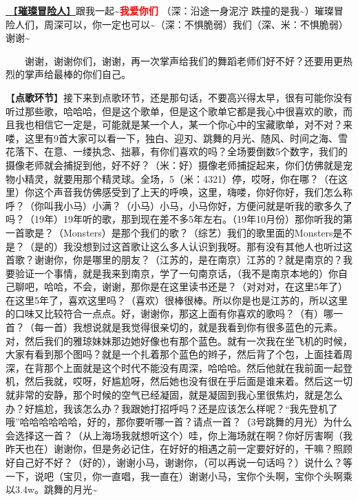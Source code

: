 \documentclass[]{ctexbook}
\begin{document}
\hyperref[adventurers]{🎵【\textbf{璀璨冒险人}】}跟我一起\textasciitilde{}\textbf{\textcolor{red}{我爱你们} }（深：沿途一身泥泞 跌撞的是我\textasciitilde）璀璨冒险人们，周深可以，你一定也可以\textasciitilde（深：不惧脆弱）我们（深、米：不惧脆弱）谢谢\textasciitilde{}

  谢谢，谢谢你们，谢谢，再一次掌声给我们的舞蹈老师们好不好？还要用更热烈的掌声给最棒的你们自己。

【\textbf{点歌环节}】接下来到点歌环节，还是那句话，不要高兴得太早，很有可能你没有听过那些歌，哈哈哈，但是这个歌单，但是这个歌单它都是我心中很喜欢的歌，而且我也相信它一定是，可能就是某一个人，某一个你心中的宝藏歌单，对不对？来喽，这里有9首大家可以看一下，独白、迎刃、跳舞的月光、随风、时间之海、雪花落下、在意、一缕执念、拙慕，有你们喜欢的吗？全场要倒数5个数字，我们的摄像老师就会捕捉到他，好不好？（米：好）摄像老师捕捉起来，你们仿佛就是宠物小精灵，就要用那个精灵球。全场，5（米：4321）停，哎呀，你在哪？（在这里）你这个声音我仿佛感受到了上天的呼唤，这里，嗨喽，你好你好，我们怎么称呼？（你叫我小马）小满？（小马）小马，小马你好，方便问就是听我的歌多久了吗？（19年）19年听的歌，那到现在差不多5年左右。（19年10月份）那你听我的第一首歌是？（Monsters）是那个我们的歌？（综艺）我们的歌里面的Monsters是不是？（是的）我没想到过这首歌让这么多人认识到我呀。那有没有其他人也听过这首歌？谢谢你，你是哪里的朋友？（江苏的，是在南京）江苏的？就是南京的？我要验证一个事情，就是我来到南京，学了一句南京话，（我不是南京本地的）你自己聊吧，哈哈，不会，谢谢，那你是在这里读书还是？（对对对，在这里5年了）在这里5年了，喜欢这里吗？（喜欢）很棒很棒。所以你是也是江苏的，所以这里的口味又比较符合一点点。好，谢谢你，那这上面有你喜欢的歌吗？（有）哪一首？（每一首）我想说就是我觉得很亲切的，就是我看到你有很多蓝色的元素。对，然后我们的雅琼妹妹那边她好像也有那个蓝色。就有一次我在坐飞机的时候，大家有看到那个图吗？就是一个扎着那个蓝色的辫子，然后背了个包，上面挂着周深，在背那个上面就是这个时代不能没有周深，哈哈哈。然后他就在我前面一起登机，然后我就，哎呀，好尴尬呀，然后她也没有很在乎后面是谁来着。然后这一切就非常的安静，那个时候的空气已经凝固，就是凝固到我心里很焦灼，就是怎么办？好尴尬，我该怎么办？我跟她打招呼吗？还是应该怎么样呢？``我先登机了哦''哈哈哈哈哈哈，好的，那你要听哪一首？请点一首？（3号跳舞的月光）为什么会选择这一首？（从上海场我就想听这个）哇，你上海场就在啊？你好厉害啊（我昨天也在）谢谢你，但是务必记住，在好好的相遇之前一定要好好的，干嘛？照顾好自己好不好？（好的），谢谢小马，谢谢你，（可以再说一句话吗？）说什么？等一下，说吧（宝贝，你一直唱，我一直在）谢谢小马，宝你个头啊，宝你个头啊乘以3.4w。跳舞的月光\textasciitilde{}
\end{document}
